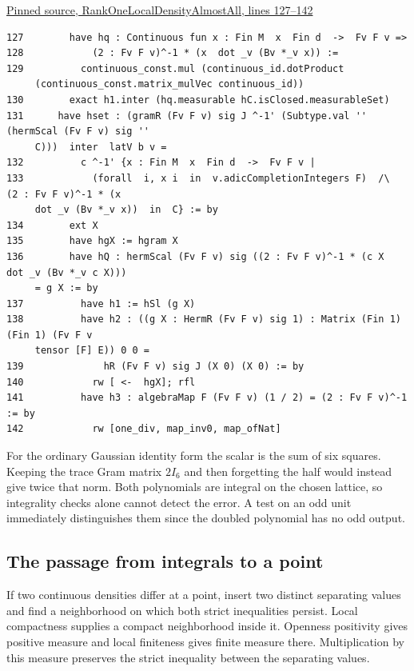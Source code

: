 \documentclass[12pt,letterpaper]{article}
\begin{document}
\par\smallskip\href{https://github.com/nousentllc/riemann-hypothesis/blob/40e56bab026552e089d7afcfeff08d2defb9c005/src/CompanionTheory/SpectralGeometry/LocalGlobalProofs/AdelicAnalysis/RankOneLocalDensityAlmostAll.lean#L127-L142}{\sffamily\small Pinned source, RankOneLocalDensityAlmostAll, lines 127--142}\par

{\footnotesize\begin{verbatim}
127        have hq : Continuous fun x : Fin M  x  Fin d  ->  Fv F v =>
128            (2 : Fv F v)^-1 * (x  dot _v (Bv *_v x)) :=
129          continuous_const.mul (continuous_id.dotProduct
     (continuous_const.matrix_mulVec continuous_id))
130        exact h1.inter (hq.measurable hC.isClosed.measurableSet)
131      have hset : (gramR (Fv F v) sig J ^-1' (Subtype.val '' (hermScal (Fv F v) sig ''
     C)))  inter  latV b v =
132          c ^-1' {x : Fin M  x  Fin d  ->  Fv F v |
133            (forall  i, x i  in  v.adicCompletionIntegers F)  /\  (2 : Fv F v)^-1 * (x
     dot _v (Bv *_v x))  in  C} := by
134        ext X
135        have hgX := hgram X
136        have hQ : hermScal (Fv F v) sig ((2 : Fv F v)^-1 * (c X  dot _v (Bv *_v c X)))
     = g X := by
137          have h1 := hSl (g X)
138          have h2 : ((g X : HermR (Fv F v) sig 1) : Matrix (Fin 1) (Fin 1) (Fv F v
     tensor [F] E)) 0 0 =
139              hR (Fv F v) sig J (X 0) (X 0) := by
140            rw [ <-  hgX]; rfl
141          have h3 : algebraMap F (Fv F v) (1 / 2) = (2 : Fv F v)^-1 := by
142            rw [one_div, map_inv0, map_ofNat]
\end{verbatim}
}

For the ordinary Gaussian identity form the scalar is the sum of six squares. Keeping the trace Gram matrix \(2I_6\) and then forgetting the half would instead give twice that norm. Both polynomials are integral on the chosen lattice, so integrality checks alone cannot detect the error. A test on an odd unit immediately distinguishes them since the doubled polynomial has no odd output.

\clearpage\subsection*{The passage from integrals to a point}

If two continuous densities differ at a point, insert two distinct separating values and find a neighborhood on which both strict inequalities persist. Local compactness supplies a compact neighborhood inside it. Openness positivity gives positive measure and local finiteness gives finite measure there. Multiplication by this measure preserves the strict inequality between the separating values.
\end{document}
